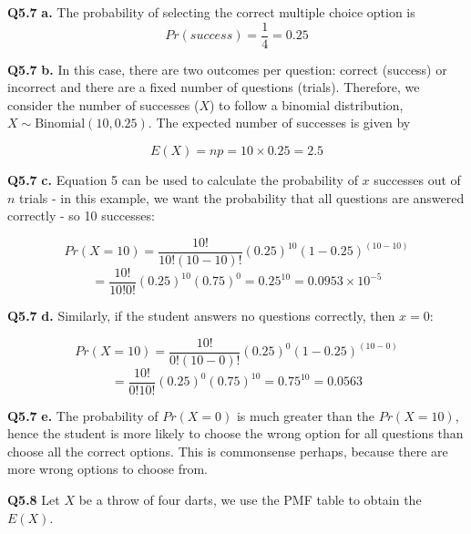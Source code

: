 \documentclass[
  oneside]{krantz}
\begin{document}
\textbf{Q5.7} \textbf{a.} The probability of selecting the correct multiple choice option is
\[Pr(success)= \frac{1}{4} = 0.25\]

\textbf{Q5.7} \textbf{b.} In this case, there are two outcomes per question: correct (success) or incorrect and there are a fixed number of questions (trials). Therefore, we consider the number of successes (\(X\)) to follow a binomial distribution, \(X \sim \textrm{Binomial}(10, 0.25)\). The expected number of successes is given by

\[E(X) = np = 10 \times 0.25 = 2.5\]

\textbf{Q5.7} \textbf{c.} Equation 5 can be used to calculate the probability of \(x\) successes out of \(n\) trials - in this example, we want the probability that all questions are answered correctly - so 10 successes:

\[Pr(X=10) = \frac{10!}{10!(10-10)!}(0.25)^{10} (1-0.25)^{(10-10)}\]
\[ = \frac{10!}{10!0!}(0.25)^10 (0.75)^{0} = 0.25^{10} = 0.0953 \times 10^{-5}\]

\textbf{Q5.7} \textbf{d.} Similarly, if the student answers no questions correctly, then \(x=0\):

\[Pr(X=10) = \frac{10!}{0!(10-0)!}(0.25)^0 (1-0.25)^{(10-0)}\]
\[= \frac{10!}{0!10!}(0.25)^0 (0.75)^{10} = 0.75^{10} = 0.0563\]

\textbf{Q5.7} \textbf{e.} The probability of \(Pr(X=0)\) is much greater than the \(Pr(X=10)\), hence the student is more likely to choose the wrong option for all questions than choose all the correct options. This is commonsense perhaps, because there are more wrong options to choose from.

\textbf{Q5.8} Let \(X\) be a throw of four darts, we use the PMF table to obtain the \(E(X)\).
\end{document}
